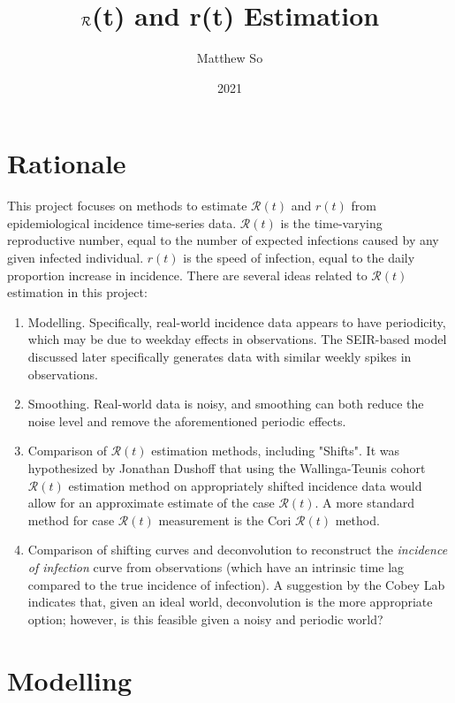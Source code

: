 \documentclass{article}
\title{$\nR$(t) and r(t) Estimation}
\author{Matthew So}
\date{2021}
\newcommand{\nR}{\mathcal{R}}
\begin{document}
\maketitle



\tableofcontents

\section{Rationale}
This project focuses on methods to estimate $\nR(t)$ and $r(t)$ from epidemiological incidence time-series data. $\nR(t)$ is the time-varying reproductive number, equal to the number of expected infections caused by any given infected individual. $r(t)$ is the speed of infection, equal to the daily proportion increase in incidence. There are several ideas related to $\nR(t)$ estimation in this project:

\begin{enumerate}
    \item Modelling. Specifically, real-world incidence data appears to have periodicity, which may be due to weekday effects in observations. The SEIR-based model discussed later specifically generates data with similar weekly spikes in observations.
    \item Smoothing. Real-world data is noisy, and smoothing can both reduce the noise level and remove the aforementioned periodic effects. 
    \item Comparison of $\nR(t)$ estimation methods, including "Shifts". It was hypothesized by Jonathan Dushoff that using the Wallinga-Teunis \cite{WallingaTeunis} cohort $\nR(t)$ estimation method on appropriately shifted incidence data would allow for an approximate estimate of the case $\nR(t)$. A more standard method for case $\nR(t)$ measurement is the Cori $\nR(t)$ method.
    \item Comparison of shifting curves and deconvolution to reconstruct the \textit{incidence of infection} curve from observations (which have an intrinsic time lag compared to the true incidence of infection). A suggestion by the Cobey Lab \cite{Gostic} indicates that, given an ideal world, deconvolution is the more appropriate option; however, is this feasible given a noisy and periodic world? 
\end{enumerate}


\section{Modelling}
\end{document}
